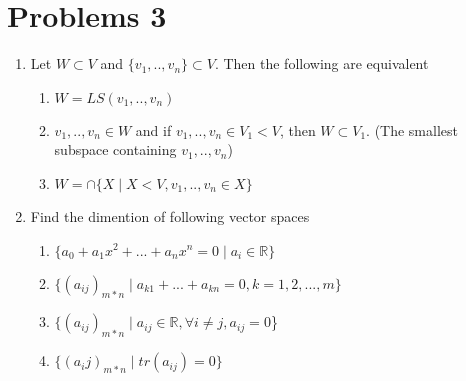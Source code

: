 \documentclass{article}
\begin{document}
\section*{Problems 3}

\begin{enumerate}
     \item Let $W\subset V$ and $\{v_1,..,v_n\}\subset V$. Then the following are equivalent 
\begin{enumerate}
\item $W=LS(v_1,..,v_n)$
\item $v_1,..,v_n \in W $ and if $v_1,..,v_n \in V_1 <V$, then $W\subset V_1$. (The smallest subspace containing $v_1,..,v_n$) 
\item $W=\cap \{X \mid X<V,v_1,..,v_n\in X\}$
\end{enumerate}
\item Find the dimention of following vector spaces
\begin{enumerate}
\item $\{a_0+a_1x^2+...+a_nx^n=0 \mid a_i\in \mathbb{R\}}$
\item $\{(a_{ij})_{m*n} \mid a_{k1}+...+a_{kn}=0, k=1,2,...,m\}$
\item $\{(a_{ij})_{m*n}\mid a_{ij}\in \mathbb{R},\forall i\neq j, a_{ij}=0$\}
\item $\{(a_ij)_{m*n}\mid tr(a_{ij})=0\}$
\end{enumerate}

\end{enumerate}
\end{document}
